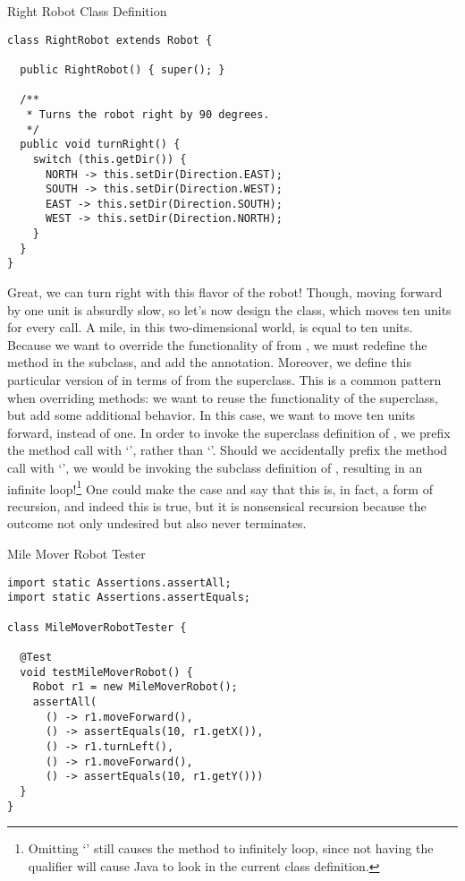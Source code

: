 \begin{cl}{Right Robot Class Definition}
\begin{lstlisting}[language=MyJava]
class RightRobot extends Robot {

  public RightRobot() { super(); }

  /**
   * Turns the robot right by 90 degrees.
   */
  public void turnRight() {
    switch (this.getDir()) {
      NORTH -> this.setDir(Direction.EAST);
      SOUTH -> this.setDir(Direction.WEST);
      EAST -> this.setDir(Direction.SOUTH);
      WEST -> this.setDir(Direction.NORTH);
    }
  }
}
\end{lstlisting}
\end{cl}

Great, we can turn right with this flavor of the robot! Though, moving forward by one unit is absurdly slow, so let's now design the  class, which moves ten units for every  call. A mile, in this two-dimensional world, is equal to ten units. Because we want to override the functionality of  from , we must redefine the method in the subclass, and add the  annotation. Moreover, we define this particular version of  in terms of  from the superclass. This is a common pattern when overriding methods: we want to reuse the functionality of the superclass, but add some additional behavior. In this case, we want to move ten units forward, instead of one. In order to invoke the superclass definition of , we prefix the method call with `', rather than `'. Should we accidentally prefix the method call with `', we would be invoking the subclass definition of , resulting in an infinite loop!\footnote{Omitting `' still causes the method to infinitely loop, since not having the qualifier will cause Java to look in the current class definition.} One could make the case and say that this is, in fact, a form of recursion, and indeed this is true, but it is nonsensical recursion because the outcome not only undesired but also never terminates.

\begin{cl}{Mile Mover Robot Tester}
\begin{lstlisting}[language=MyJava]
import static Assertions.assertAll;
import static Assertions.assertEquals;

class MileMoverRobotTester {

  @Test
  void testMileMoverRobot() {
    Robot r1 = new MileMoverRobot();
    assertAll(
      () -> r1.moveForward(),
      () -> assertEquals(10, r1.getX()),
      () -> r1.turnLeft(),
      () -> r1.moveForward(),
      () -> assertEquals(10, r1.getY()))
  }
}
\end{lstlisting}
\end{cl}

